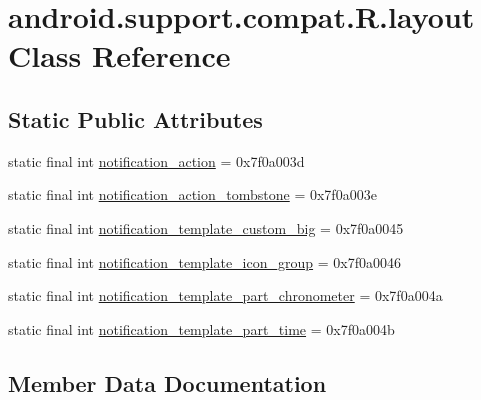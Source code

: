 \hypertarget{classandroid_1_1support_1_1compat_1_1R_1_1layout}{}\section{android.\+support.\+compat.\+R.\+layout Class Reference}
\label{classandroid_1_1support_1_1compat_1_1R_1_1layout}
\subsection*{Static Public Attributes}
\begin{DoxyCompactItemize}
\item 
static final int \mbox{\hyperlink{classandroid_1_1support_1_1compat_1_1R_1_1layout_ad79e4fe83c760de6618f10481cf5fcc0}{notification\+\_\+action}} = 0x7f0a003d
\item 
static final int \mbox{\hyperlink{classandroid_1_1support_1_1compat_1_1R_1_1layout_af9477b0f36fd53636d0a5d7bd5886ce4}{notification\+\_\+action\+\_\+tombstone}} = 0x7f0a003e
\item 
static final int \mbox{\hyperlink{classandroid_1_1support_1_1compat_1_1R_1_1layout_a0b54b8630957de0e06eef8abefdf814e}{notification\+\_\+template\+\_\+custom\+\_\+big}} = 0x7f0a0045
\item 
static final int \mbox{\hyperlink{classandroid_1_1support_1_1compat_1_1R_1_1layout_a5cbbbeccfd09c138a8cc351aa1a7adce}{notification\+\_\+template\+\_\+icon\+\_\+group}} = 0x7f0a0046
\item 
static final int \mbox{\hyperlink{classandroid_1_1support_1_1compat_1_1R_1_1layout_aeea5b97200646849c345579998f4543e}{notification\+\_\+template\+\_\+part\+\_\+chronometer}} = 0x7f0a004a
\item 
static final int \mbox{\hyperlink{classandroid_1_1support_1_1compat_1_1R_1_1layout_a6cb602573ee4bfe6e0e12b0493d0350f}{notification\+\_\+template\+\_\+part\+\_\+time}} = 0x7f0a004b
\end{DoxyCompactItemize}


\subsection{Member Data Documentation}
\mbox{\label{classandroid_1_1support_1_1compat_1_1R_1_1layout_ad79e4fe83c760de6618f10481cf5fcc0}} 
